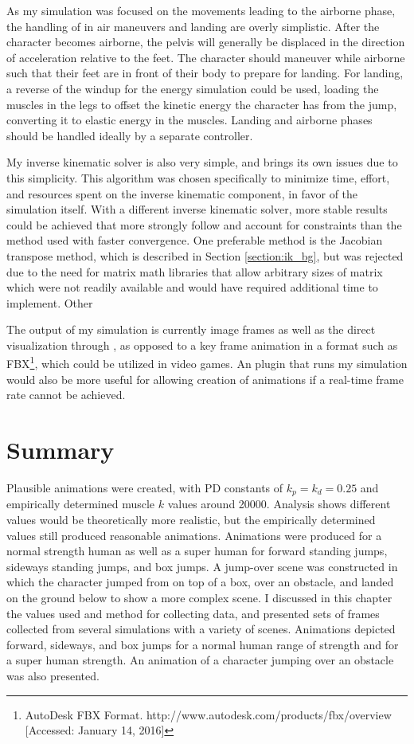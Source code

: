As my simulation was focused on the movements leading to the airborne phase, the handling of in air maneuvers and landing are overly simplistic.  After the character becomes airborne, the pelvis will generally be displaced in the direction of acceleration relative to the feet.  The character should maneuver while airborne such that their feet are in front of their body to prepare for landing.  For landing, a reverse of the windup for the energy simulation could be used, loading the muscles in the legs to offset the kinetic energy the character has from the jump, converting it to elastic energy in the muscles.  Landing and airborne phases should be handled ideally by a separate controller.

My inverse kinematic solver is also very simple, and brings its own issues due to this simplicity.  This algorithm was chosen specifically to minimize time, effort, and resources spent on the inverse kinematic component, in favor of the simulation itself.  With a different inverse kinematic solver, more stable results could be achieved that more strongly follow and account for constraints than the method used with faster convergence.  One preferable method is the Jacobian transpose method, which is described in Section \ref{section:ik_bg}, but was rejected due to the need for matrix math libraries that allow arbitrary sizes of matrix which were not readily available and would have required additional time to implement.  Other 

The output of my simulation is currently image frames as well as the direct visualization through \unity{}, as opposed to a key frame animation in a format such as FBX\footnote{AutoDesk FBX Format. http://www.autodesk.com/products/fbx/overview [Accessed: January 14, 2016]}, which could be utilized in video games.  An \maya{}  plugin that runs my simulation would also be more useful for allowing creation of animations if a real-time frame rate cannot be achieved.

\section{Summary}
\label{section:results_summary}
Plausible animations were created, with PD constants of $k_p = k_d = 0.25$ and empirically determined muscle $k$ values around 20000.  Analysis shows different values would be theoretically more realistic, but the empirically determined values still produced reasonable animations.  Animations were produced for a normal strength human as well as a super human for forward standing jumps, sideways standing jumps, and box jumps.  A jump-over scene was constructed in which the character jumped from on top of a box, over an obstacle, and landed on the ground below to show a more complex scene.  I discussed in this chapter the values used and method for collecting data, and presented sets of frames collected from several simulations with a variety of scenes.  Animations depicted forward, sideways, and box jumps for a normal human range of strength and for a super human strength.  An animation of a character jumping over an obstacle was also presented.